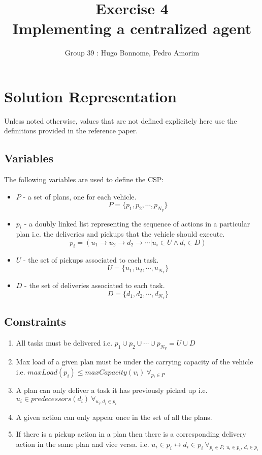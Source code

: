 \documentclass[11pt]{article}
\title{\bf Exercise 4\\ Implementing a centralized agent}
\author{Group 39 : Hugo Bonnome, Pedro Amorim}
\begin{document}
\maketitle

\section{Solution Representation}
Unless noted otherwise, values that are not defined explicitely here use the
definitions provided in the reference paper. 

\subsection{Variables}
The following variables are used to define the CSP:
\begin{itemize}
\item $P$ - a set of plans, one for each vehicle.
  $$P = \{p_1, p_2,\cdots, p_{N_V}\}$$
\item $p_i$ - a doubly linked list representing the sequence of actions in a
  particular plan i.e. the deliveries and pickups that the vehicle should
  execute.
  $$p_i = (u_1 \rightarrow u_2 \rightarrow d_2 \rightarrow \cdots | u_i \in U
  \wedge d_i \in D)$$
\item $U$ - the set of pickups associated to each task.
  $$U = \{u_1, u_2, \cdots, u_{N_T}\}$$
\item $D$ - the set of deliveries associated to each task.
  $$D = \{d_1, d_2, \cdots, d_{N_T}\}$$
\end{itemize}

\subsection{Constraints}
\begin{enumerate}
\item All tasks must be delivered i.e. $p_1 \cup p_2 \cup \cdots \cup p_{N_V} = U
  \cup D$ 
\item Max load of a given plan must be under the carrying capacity of the
  vehicle i.e. $maxLoad(p_i) \leq maxCapacity(v_i)\  \forall_{p_i \in P}$
\item A plan can only deliver a task it has previously picked up i.e. $u_i \in
  predecessors(d_i)\ \forall_{u_i, d_i \in p_i}$
\item A given action can only appear once in the set of all the plans.
\item If there is a pickup action in a plan then there is a corresponding
delivery action in the same plan and vice versa. i.e. $u_i \in p_i
\leftrightarrow d_i \in p_i \ \forall_{p_i \in P,\  u_i \in p_i,\  d_i \in p_i}$
\end{enumerate}
\end{document}
